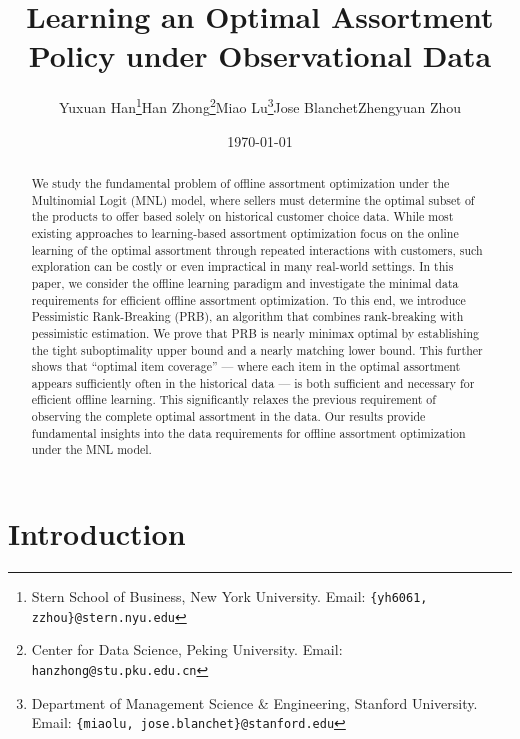 \documentclass[10pt, letterpaper]{article}
\title{\LARGE  Learning an Optimal Assortment Policy under Observational Data}
\author{
    Yuxuan Han\thanks{Stern School of Business, New York University. Email: \texttt{\{yh6061, zzhou\}@stern.nyu.edu}}\qquad Han Zhong\thanks{Center for Data Science, Peking University. Email: 
 \texttt{hanzhong@stu.pku.edu.cn}}\qquad Miao Lu\thanks{Department of Management Science \& Engineering, Stanford University. Email: \texttt{\{miaolu, jose.blanchet\}@stanford.edu}}\qquad Jose Blanchet\footnotemark[3]\qquad Zhengyuan Zhou\footnotemark[1]
}
\date{\small{\today}}
\begin{document}

\maketitle



\begin{abstract}
    We study the fundamental problem of offline assortment optimization under the Multinomial Logit (MNL) model, where sellers must determine the optimal subset of the products to offer based solely on historical customer choice data. 
    While most existing approaches to learning-based assortment optimization focus on the online learning of the optimal assortment through repeated interactions with customers, such exploration can be costly or even impractical in many real-world settings. 
    In this paper, we consider the offline learning paradigm and investigate the minimal data requirements for efficient offline assortment optimization.
    To this end, we introduce Pessimistic Rank-Breaking (PRB), an algorithm that combines rank-breaking with pessimistic estimation. 
    We prove that PRB is nearly minimax optimal by establishing the tight suboptimality upper bound and a nearly matching lower bound. This further shows that ``optimal item coverage'' --- where each item in the optimal assortment appears sufficiently often in the historical data --- is both sufficient and necessary for efficient offline learning. 
    This significantly relaxes the previous requirement of observing the complete optimal assortment in the data. Our results provide fundamental insights into the data requirements for offline assortment optimization under the MNL model.
\end{abstract}




\section{Introduction}\label{sec:Intro}
\end{document}
